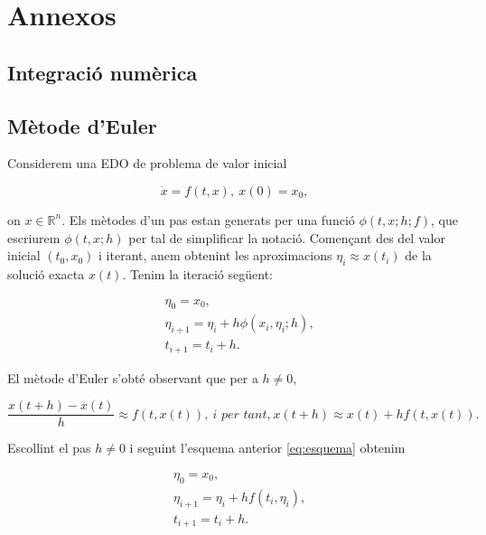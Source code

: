 \documentclass[11pt,a4paper,openright,oneside]{article}
\numberwithin{equation}{section}
\theoremstyle{definition}
\begin{document}
\newpage

\appendix
\section{Annexos} \label{ap:annex}
\subsection{Integració numèrica}

\subsection*{Mètode d'Euler}

Considerem una EDO de problema de valor inicial 

\begin{equation*}
    \dot{x}=f(t,x), \ x(0)=x_0,
\end{equation*}

on $x\in \mathbb{R}^n$. Els mètodes d'un pas estan generats per una funció $\phi(t, x; h; f)$, que escriurem $\phi(t,x;h)$ per tal de simplificar la notació. Començant des del valor inicial $(t_0, x_0)$ i iterant, anem obtenint les aproximacions $\eta_i \approx x(t_i)$ de la solució exacta $x(t)$. Tenim la iteració següent:

\begin{equation} \begin{aligned} \label{eq:esquema}
    &\eta_0 = x_0, \\
    &\eta_{i+1} = \eta_i + h\phi(x_i, \eta_i; h), \\
    &t_{i+1} = t_i + h.
\end{aligned} \end{equation}

El mètode d'Euler s'obté observant que per a $h\neq0$,

\begin{equation*}
    \frac{x(t+h)-x(t)}{h}\approx f(t, x(t)), \ \textit{i per tant,} \  x(t+h) \approx x(t) + hf(t, x(t)).
\end{equation*}

Escollint el pas $h \neq 0$ i seguint l'esquema anterior \eqref{eq:esquema} obtenim

\begin{equation*}\begin{aligned}
    &\eta_0 = x_0, \\
    &\eta_{i+1} = \eta_i + hf(t_i, \eta_i), \\
    &t_{i+1} = t_i + h.
\end{aligned}\end{equation*}
\end{document}
